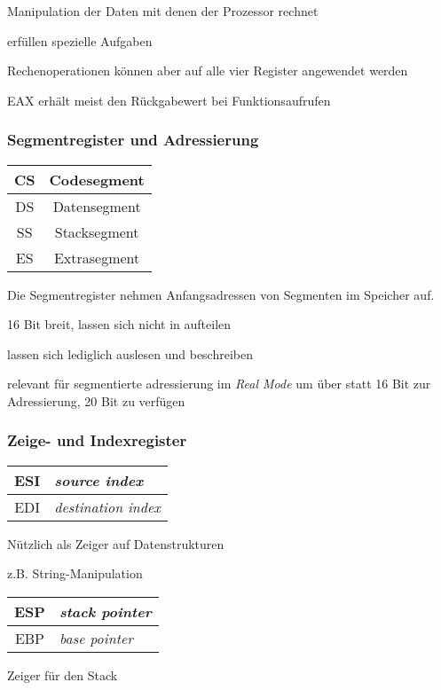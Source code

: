 Manipulation der Daten mit denen der Prozessor rechnet

erfüllen spezielle Aufgaben

Rechenoperationen können aber auf alle vier Register angewendet werden

EAX erhält meist den Rückgabewert bei Funktionsaufrufen



\subsubsection{Segmentregister und Adressierung}

\begin{tabular}{|c|c|}
\hline CS & Codesegment \\
\hline DS & Datensegment \\
\hline SS & Stacksegment \\
\hline ES & Extrasegment\\
\hline
\end{tabular}

Die Segmentregister nehmen Anfangsadressen von Segmenten im Speicher auf.

16 Bit breit, lassen sich nicht in aufteilen

lassen sich lediglich auslesen und beschreiben

relevant für segmentierte adressierung im \emph{Real Mode} um über statt 16 Bit
zur Adressierung, 20 Bit zu verfügen

\subsubsection{Zeige- und Indexregister}

\begin{tabular}{|c|l|}
\hline ESI & \emph{source index} \\
\hline EDI & \emph{destination index} \\
\hline
\end{tabular}

Nützlich als Zeiger auf Datenstrukturen

z.B. String-Manipulation


\begin{tabular}{|c|l|}
\hline ESP & \emph{stack pointer}\\
\hline EBP & \emph{base pointer} \\
\hline
\end{tabular}

Zeiger für den Stack


